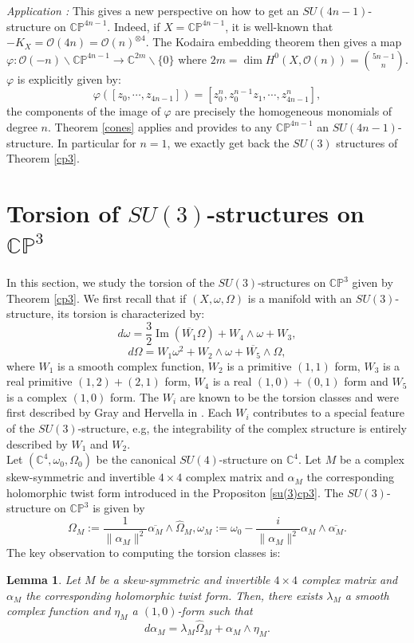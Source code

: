 \documentclass[12pt, reqno]{amsart}
\newtheorem{lemma}[Def]{Lemma}
\DeclareMathOperator\Ima{Im}
\newcommand{\C}{\mathbb{C}}
\newcommand{\p}{\mathbb{P}}
\newcommand{\Or}{\mathcal{O}}
\begin{document}
\textit{Application :} This gives a new perspective on how to get an $SU(4n-1)$-structure on $\C\p^{4n-1}$. Indeed, if $X=\C\p^{4n-1}$, it is well-known that $-K_X=\Or(4n)=\Or(n)^{\otimes 4}$. The Kodaira embedding theorem then gives a map $\varphi : \Or(-n)\backslash\C\p^{4n-1}\to\C^{2m}\backslash\{0\}$ where $2m=\dim H^0(X,\Or(n))=\binom{5n-1}{n}$. $\varphi$ is explicitly given by: \[\varphi([z_0,\cdots,z_{4n-1}])=[z_0^n,z_0^{n-1}z_1,\cdots,z_{4n-1}^n],\]  the components of the image of $\varphi$ are precisely the homogeneous monomials of degree $n$. Theorem \ref{cones} applies and provides to any $\C\p^{4n-1}$ an $SU(4n-1)$-structure. In particular for $n=1$, we exactly get back the $SU(3)$ structures of Theorem \ref{cp3}. 
\section{Torsion of $SU(3)$-structures on $\C\p^3$} 
In this section, we study the torsion of the $SU(3)$-structures on $\C\p^3$ given by Theorem \ref{cp3}. We first recall that if $(X,\omega,\Omega)$ is a manifold with an $SU(3)$-structure, its torsion is characterized by: \[d\omega=\frac{3}{2}\Ima(\overline{W_1}\Omega)+W_4\wedge\omega+W_3,\] \[d\Omega=W_1\omega^2+W_2\wedge\omega+\overline{W_5}\wedge\Omega,\] where $W_1$ is a smooth complex function, $W_2$ is a primitive $(1,1)$ form, $W_3$ is a real primitive $(1,2)+(2,1)$ form, $W_4$ is a real $(1,0)+(0,1)$ form and $W_5$ is a complex $(1,0)$ form. The $W_i$ are known to be the torsion classes and were first described by Gray and Hervella in \cite{Grayhervella}. Each $W_i$ contributes to a special feature of the $SU(3)$-structure, e.g, the integrability of the complex structure is entirely described by $W_1$ and $W_2$. \\
\indent Let $(\C^4,\omega_0,\Omega_0)$ be the canonical $SU(4)$-structure on $\C^4$. Let $M$ be a complex skew-symmetric and invertible $4\times 4$ complex matrix and $\alpha_M$ the corresponding holomorphic twist form introduced in the Propositon \ref{su(3)cp3}. The $SU(3)$-structure on $\C\p^3$ is given by \[\Omega_M:=\frac{1}{\|\alpha_M\|^2}\overline{\alpha_M}\wedge\hat\Omega_M, \omega_M:=\omega_0-\frac{i}{\|\alpha_M\|^2}\alpha_M\wedge\overline{\alpha_M}.\] The key observation to computing the torsion classes is: \begin{lemma} Let $M$ be a skew-symmetric and invertible $4\times 4$ complex matrix and $\alpha_M$ the corresponding holomorphic twist form. 
    Then, there exists $\lambda_M$ a smooth complex function and $\eta_M$ a $(1,0)$-form such that \[d\alpha_M=\lambda_M\hat\Omega_M+\alpha_M\wedge\eta_M.\]
\end{lemma}
\end{document}
